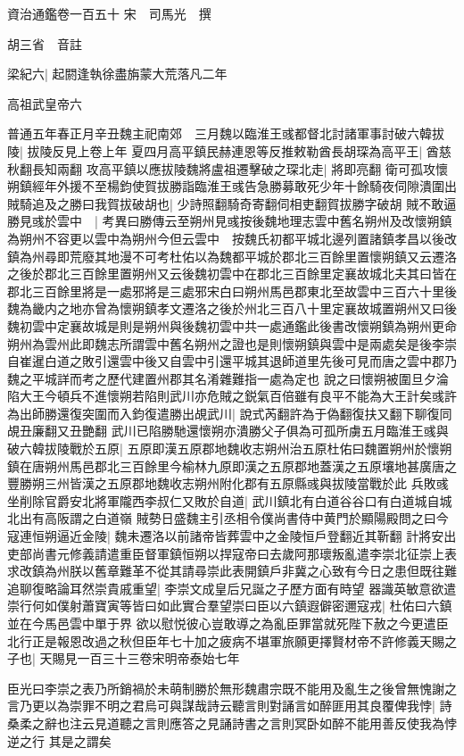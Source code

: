 資治通鑑卷一百五十
宋　司馬光　撰

胡三省　音註

梁紀六|{
	起閼逢執徐盡旃蒙大荒落凡二年}


高祖武皇帝六

普通五年春正月辛丑魏主祀南郊　三月魏以臨淮王彧都督北討諸軍事討破六韓拔陵|{
	拔陵反見上卷上年}
夏四月高平鎮民赫連恩等反推敕勒酋長胡琛為高平王|{
	酋慈秋翻長知兩翻}
攻高平鎮以應拔陵魏將盧祖遷擊破之琛北走|{
	將即亮翻}
衛可孤攻懷朔鎮經年外援不至楊鈞使賀拔勝詣臨淮王彧告急勝募敢死少年十餘騎夜伺隙潰圍出賊騎追及之勝曰我賀拔破胡也|{
	少詩照翻騎奇寄翻伺相吏翻賀拔勝字破胡}
賊不敢逼勝見彧於雲中　|{
	考異曰勝傳云至朔州見彧按後魏地理志雲中舊名朔州及改懷朔鎮為朔州不容更以雲中為朔州今但云雲中　按魏氏初都平城北邊列置諸鎮孝昌以後改鎮為州尋即荒廢其地漫不可考杜佑以為魏都平城於郡北三百餘里置懷朔鎮又云遷洛之後於郡北三百餘里置朔州又云後魏初雲中在郡北三百餘里定襄故城北夫其曰皆在郡北三百餘里將是一處邪將是三處邪宋白曰朔州馬邑郡東北至故雲中三百六十里後魏為畿内之地亦曾為懷朔鎮孝文遷洛之後於州北三百八十里定襄故城置朔州又曰後魏初雲中定襄故城是則是朔州與後魏初雲中共一處通鑑此後書改懷朔鎮為朔州更命朔州為雲州此即魏志所謂雲中舊名朔州之證也是則懷朔鎮與雲中是兩處矣是後李崇自崔暹白道之敗引還雲中後又自雲中引還平城其退師道里先後可見而唐之雲中郡乃魏之平城詳而考之歷代建置州郡其名淆雜難指一處為定也}
說之曰懷朔被圍旦夕淪陷大王今頓兵不進懷朔若陷則武川亦危賊之鋭氣百倍雖有良平不能為大王計矣彧許為出師勝還復突圍而入鈞復遣勝出覘武川|{
	說式芮翻許為于偽翻復扶又翻下聊復同覘丑廉翻又丑艷翻}
武川已陷勝馳還懷朔亦潰勝父子俱為可孤所虜五月臨淮王彧與破六韓拔陵戰於五原|{
	五原即漢五原郡地魏收志朔州治五原杜佑曰魏置朔州於懷朔鎮在唐朔州馬邑郡北三百餘里今榆林九原即漢之五原郡地蓋漢之五原壤地甚廣唐之豐勝朔三州皆漢之五原郡地魏收志朔州附化郡有五原縣彧與拔陵當戰於此}
兵敗彧坐削除官爵安北將軍隴西李叔仁又敗於自道|{
	武川鎮北有白道谷谷口有白道城自城北出有高阪謂之白道嶺}
賊勢日盛魏主引丞相令僕尚書侍中黄門於顯陽殿問之曰今寇連恒朔逼近金陵|{
	魏未遷洛以前諸帝皆葬雲中之金陵恒戶登翻近其靳翻}
計將安出吏部尚書元修義請遣重臣督軍鎮恒朔以捍寇帝曰去歲阿那瓌叛亂遣李崇北征崇上表求改鎮為州朕以舊章難革不從其請尋崇此表開鎮戶非冀之心致有今日之患但既往難追聊復略論耳然崇貴戚重望|{
	李崇文成皇后兄誕之子歷方面有時望}
器識英敏意欲遣崇行何如僕射蕭寶寅等皆曰如此實合羣望崇曰臣以六鎮遐僻密邇寇戎|{
	杜佑曰六鎮並在今馬邑雲中單于界}
欲以慰悦彼心豈敢導之為亂臣罪當就死陛下赦之今更遣臣北行正是報恩改過之秋但臣年七十加之疲病不堪軍旅願更擇賢材帝不許修義天賜之子也|{
	天賜見一百三十三卷宋明帝泰始七年}


臣光曰李崇之表乃所銷禍於未萌制勝於無形魏肅宗既不能用及亂生之後曾無愧謝之言乃更以為崇罪不明之君烏可與謀哉詩云聽言則對誦言如醉匪用其良覆俾我悖|{
	詩桑柔之辭也注云見道聽之言則應答之見誦詩書之言則冥卧如醉不能用善反使我為悖逆之行}
其是之謂矣

